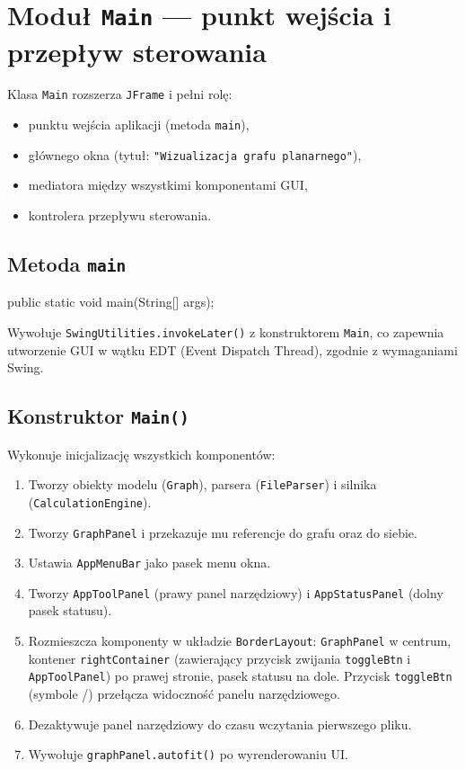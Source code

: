 \documentclass[a4paper, 11pt]{article}
\begin{document}
\section{Moduł \texttt{Main} --- punkt wejścia i przepływ sterowania}

Klasa \texttt{Main} rozszerza \texttt{JFrame} i pełni rolę:
\begin{itemize}
  \item punktu wejścia aplikacji (metoda \texttt{main}),
  \item głównego okna (tytuł: \texttt{"Wizualizacja grafu planarnego"}),
  \item mediatora między wszystkimi komponentami GUI,
  \item kontrolera przepływu sterowania.
\end{itemize}

\subsection{Metoda \texttt{main}}

\begin{cmdbox}
public static void main(String[] args);
\end{cmdbox}

Wywołuje \texttt{SwingUtilities.invokeLater()} z konstruktorem
\texttt{Main}, co zapewnia utworzenie GUI w wątku EDT (Event Dispatch
Thread), zgodnie z wymaganiami Swing.

\subsection{Konstruktor \texttt{Main()}}

Wykonuje inicjalizację wszystkich komponentów:
\begin{enumerate}
  \item Tworzy obiekty modelu (\texttt{Graph}), parsera (\texttt{FileParser})
    i silnika (\texttt{CalculationEngine}).
  \item Tworzy \texttt{GraphPanel} i przekazuje mu referencje do grafu
    oraz do siebie.
  \item Ustawia \texttt{AppMenuBar} jako pasek menu okna.
  \item Tworzy \texttt{AppToolPanel} (prawy panel narzędziowy)
    i \texttt{AppStatusPanel} (dolny pasek statusu).
  \item Rozmieszcza komponenty w układzie \texttt{BorderLayout}:
    \texttt{GraphPanel} w centrum, kontener \texttt{rightContainer}
    (zawierający przycisk zwijania \texttt{toggleBtn} i \texttt{AppToolPanel})
    po prawej stronie, pasek statusu na dole. Przycisk \texttt{toggleBtn}
    (symbole \texttt{\guillemotleft}/\texttt{\guillemotright}) przełącza widoczność panelu narzędziowego.
  \item Dezaktywuje panel narzędziowy do czasu wczytania pierwszego pliku.
  \item Wywołuje \texttt{graphPanel.autofit()} po wyrenderowaniu UI.
\end{enumerate}
\end{document}
